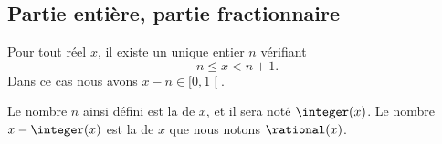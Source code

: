 \subsection{Partie entière, partie fractionnaire}

\begin{lemmaDef}      \label{LEMooLEXTooGAQxGB}
	Pour tout réel \( x\), il existe un unique entier \( n\) vérifiant
	\begin{equation}
		n\leq x<n+1.
	\end{equation}
	Dans ce cas nous avons \( x-n\in\mathopen[ 0 , 1 \mathclose[\).

	Le nombre \( n\) ainsi défini est la  de \( x\), et il sera noté \( \integer(x)\). Le nombre \( x-\integer(x)\) est la  de \( x\) que nous notons \( \rational(x)\).

\end{lemmaDef}

